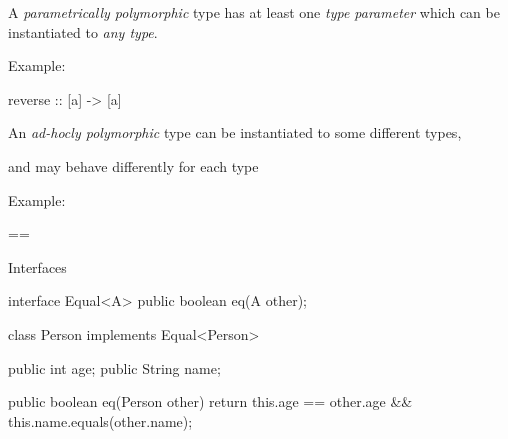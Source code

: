 \documentclass[usenames,dvipsnames,svgnames,table,aspectratio=169,mathserif]{beamer}
\newcommand{\nl}{\vspace{\baselineskip}}
\newcommand{\pnl}{\pause \nl}
\begin{document}
\begin{frame}[fragile]

A {\it parametrically polymorphic} type has at least one {\it type parameter}
which can be instantiated to {\it any type}.

\nl



Example:

\begin{haskellcode}
reverse :: [a] -> [a]
\end{haskellcode}

\end{frame}


\begin{frame}[fragile]

An {\it ad-hocly polymorphic} type can be instantiated to some different types,

and may behave differently for each type

\nl

Example:

\begin{javacode}
==
\end{javacode}

\end{frame}




\begin{frame}
\begin{center}
\huge{Interfaces}
\end{center}
\end{frame}


\begin{frame}[fragile]
\begin{javacode}
interface Equal<A> {
  public boolean eq(A other);
}
\end{javacode}

\pause

\begin{javacode}
class Person implements Equal<Person> {
  public int age;
  public String name;

  public boolean eq(Person other) {
    return this.age == other.age && this.name.equals(other.name);
  }
}
\end{javacode}
\end{frame}
\end{document}
